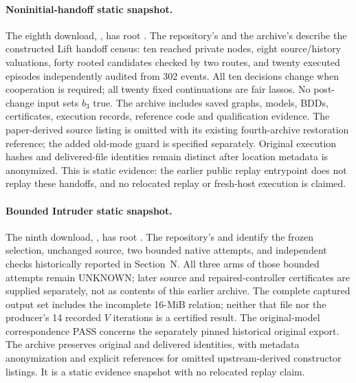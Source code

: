 \paragraph{Noninitial-handoff static snapshot.}
The eighth download,
, has root
. The repository's
 and the archive's 
describe the constructed Lift handoff census: ten reached private nodes,
eight source/history valuations, forty rooted candidates checked by two
routes, and twenty executed episodes independently audited from 302 events.
All ten decisions change when cooperation is required; all twenty fixed
continuations are fair lassos. No post-change input sets $b_3$ true.
The archive includes saved graphs, models, BDDs, certificates, execution
records, reference code and qualification evidence. The paper-derived
source listing is omitted with its existing fourth-archive restoration
reference; the added old-mode guard is specified separately. Original
execution hashes and delivered-file identities remain distinct after
location metadata is anonymized. This is static evidence: the earlier
public replay entrypoint does not replay these handoffs, and no relocated
replay or fresh-host execution is claimed.

\paragraph{Bounded Intruder static snapshot.}
The ninth download, , has root
. The repository's
 and
 identify the frozen selection,
unchanged source, two bounded native attempts, and independent checks
historically reported in Section~N. All three arms of those bounded
attempts remain UNKNOWN; later source and repaired-controller certificates
are supplied separately, not as contents of this earlier archive.
The complete captured output set includes the incomplete 16-MiB relation;
neither that file nor the producer's 14 recorded $V$ iterations is a
certified result. The original-model correspondence PASS concerns the
separately pinned historical original export. The archive preserves
original and delivered identities, with metadata anonymization and
explicit references for omitted upstream-derived constructor listings.
It is a static evidence snapshot with no relocated replay claim.

